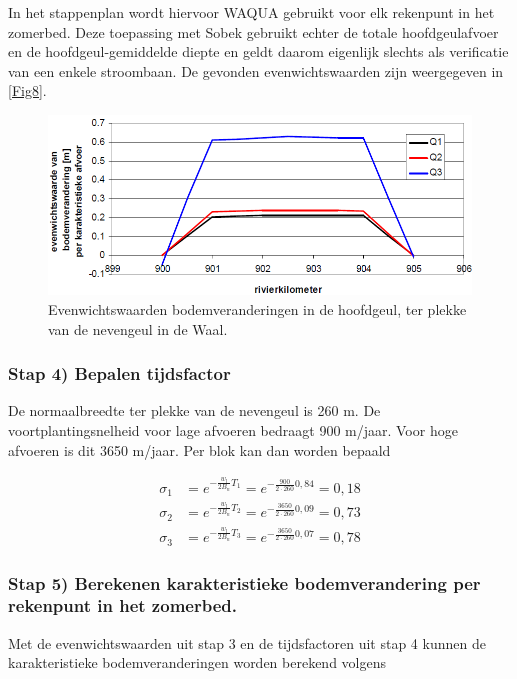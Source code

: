\Note In het stappenplan wordt hiervoor WAQUA gebruikt voor elk rekenpunt in het zomerbed.
Deze toepassing met Sobek gebruikt echter de totale hoofdgeulafvoer en de hoofdgeul-gemiddelde diepte en geldt daarom eigenlijk slechts als verificatie van een enkele stroombaan.
De gevonden evenwichtswaarden zijn weergegeven in \autoref{Fig8}.

\begin{figure}
\includegraphics[width=\columnwidth]{figures/Fig8.png}
\caption{Evenwichtswaarden bodemveranderingen in de hoofdgeul, ter plekke van de nevengeul in de Waal.}
\label{Fig8}
\end{figure}

\subsubsection*{Stap 4) Bepalen tijdsfactor}

De normaalbreedte ter plekke van de nevengeul is 260 m.
De voortplantingsnelheid voor lage afvoeren bedraagt 900 m/jaar.
Voor hoge afvoeren is dit 3650 m/jaar.
Per blok kan dan worden bepaald

\begin{align}
\sigma_1 &= e^{-\frac{w_l}{2B_n}T_1} = e^{-\frac{900}{2 \cdot 260} 0,84} = 0,18 \\
\sigma_2 &= e^{-\frac{w_l}{2B_n}T_2} = e^{-\frac{3650}{2 \cdot 260} 0,09} = 0,73 \\
\sigma_3 &= e^{-\frac{w_l}{2B_n}T_3} = e^{-\frac{3650}{2 \cdot 260} 0,07} = 0,78
\end{align}

\subsubsection*{Stap 5) Berekenen karakteristieke bodemverandering per rekenpunt in het zomerbed.}

Met de evenwichtswaarden uit stap 3 en de tijdsfactoren uit stap 4 kunnen de karakteristieke bodemveranderingen worden berekend volgens

